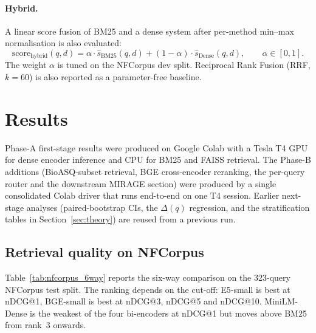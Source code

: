 \documentclass[11pt,a4paper]{article}
\begin{document}
\paragraph{Hybrid.}
A linear score fusion of BM25 and a dense system after per-method
min--max normalisation is also evaluated:
\begin{equation}
    \text{score}_{\text{hybrid}}(q,d) =
    \alpha \cdot \hat{s}_{\text{BM25}}(q,d) + (1-\alpha) \cdot \hat{s}_{\text{Dense}}(q,d),
    \qquad \alpha \in [0,1].
    \label{eq:hybrid}
\end{equation}
The weight $\alpha$ is tuned on the NFCorpus dev split. Reciprocal Rank
Fusion (RRF, $k=60$) is also reported as a parameter-free baseline.

\section{Results}

Phase-A first-stage results were produced on Google Colab with a Tesla
T4 GPU for dense encoder inference and CPU for BM25 and FAISS retrieval.
The Phase-B additions (BioASQ-subset retrieval, BGE cross-encoder
reranking, the per-query router and the downstream MIRAGE section) were
produced by a single consolidated Colab driver that runs end-to-end on
one T4 session. Earlier next-stage analyses (paired-bootstrap CIs,
the $\Delta(q)$ regression, and the stratification tables in
Section~\ref{sec:theory}) are reused from a previous run.

\subsection{Retrieval quality on NFCorpus}
\label{subsec:nf_quality}

Table~\ref{tab:nfcorpus_6way} reports the six-way comparison on the
323-query NFCorpus test split. The ranking depends on the cut-off:
E5-small is best at nDCG@1, BGE-small is best at nDCG@3, nDCG@5 and
nDCG@10. MiniLM-Dense is the weakest of the four bi-encoders at
nDCG@1 but moves above BM25 from rank~3 onwards.

\begin{table}[ht]
    \centering
    \caption{Retrieval quality on the NFCorpus test split (323 queries).
    The best result per metric is in bold. SPLADE and MedCPT are reported
    only at the top-10 cut-off because the original logging for those
    two systems was limited to nDCG@10, MAP@10, Recall@10 and P@10.}
    \label{tab:nfcorpus_6way}
    \small
    
\end{table}
\end{document}
